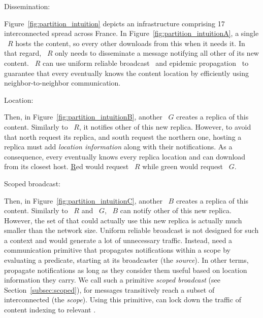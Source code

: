 \begin{asparadesc}
\item [Dissemination:]

Figure~\ref{fig:partition_intuition} depicts an infrastructure
comprising 17 interconnected \processes spread across France. In
Figure~\ref{fig:partition_intuitionA}, a single \Process~$R$ hosts the
content, so every other \process downloads from this \process when it
needs it. In that regard, \Process~$R$ only needs to disseminate a
message notifying all other \processes of its new
content. \Process~$R$ can use uniform reliable
broadcast~\cite{hadzilacos1994modular} and epidemic
propagation~\cite{epidemic-protocol} to guarantee that every \process
eventually knows the content location by efficiently using
neighbor-to-neighbor communication.

\item [Location:]

Then, in Figure~\ref{fig:partition_intuitionB}, another \Process~$G$
creates a replica of this content. Similarly to \Process~$R$, it
notifies other \processes of this new replica. However, to avoid that
north \processes request its replica, and south \processes request the
northern one, \processes hosting a replica must add \emph{location
information} along with their notifications. As a consequence, every
\process eventually knows every replica location and can download from
its closest host. \underline{R}ed \processes would request
\Process~$R$ while \underline{g}reen \processes would request
\Process~$G$.

\item [Scoped broadcast:]

Then, in Figure~\ref{fig:partition_intuitionC}, another \Process~$B$
creates a replica of this content. Similarly to \Process~$R$ and
\Process~$G$, \Process~$B$ can notify other \processes of this new
replica. However, the set of \processes that could actually use this
new replica is actually much smaller than the network size. Uniform
reliable broadcast is not designed for such a context and would
generate a lot of unnecessary traffic. Instead, \processes need a
communication primitive that propagates notifications within a scope
by evaluating a predicate, starting at its broadcaster (the
\emph{source}).  In other terms, \processes propagate notifications as
long as they consider them useful based on location information they
carry. We call such a primitive \emph{scoped broadcast} (see
Section~\ref{subsec:scoped}), for messages transitively reach a subset
of interconnected \processes (the \emph{scope}). Using this primitive,
\processes can lock down the traffic of content indexing to relevant
\processes.


\end{asparadesc}
